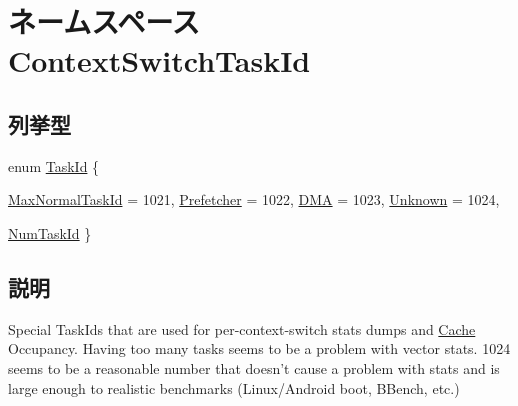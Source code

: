 \hypertarget{namespaceContextSwitchTaskId}{
\section{ネームスペース ContextSwitchTaskId}
\label{namespaceContextSwitchTaskId}
}
\subsection*{列挙型}
\begin{DoxyCompactItemize}
\item 
enum \hyperlink{namespaceContextSwitchTaskId_aa8dd388981e62e592eb420a58ab290b7}{TaskId} \{ \par
\hyperlink{namespaceContextSwitchTaskId_aa8dd388981e62e592eb420a58ab290b7a675ac8c10b4bdb20e74ca50add8789f5}{MaxNormalTaskId} =  1021, 
\hyperlink{namespaceContextSwitchTaskId_aa8dd388981e62e592eb420a58ab290b7a9f338c28f1a3b00da1f6f2cb2982dcd0}{Prefetcher} =  1022, 
\hyperlink{namespaceContextSwitchTaskId_aa8dd388981e62e592eb420a58ab290b7a6537a62f6f155792bb9a320ee2ec4d68}{DMA} =  1023, 
\hyperlink{namespaceContextSwitchTaskId_aa8dd388981e62e592eb420a58ab290b7a4e81c184ac3ad48a389cd4454c4a05bb}{Unknown} =  1024, 
\par
\hyperlink{namespaceContextSwitchTaskId_aa8dd388981e62e592eb420a58ab290b7aed1b0e3dbb2efd4067685b0be5b03167}{NumTaskId}
 \}
\end{DoxyCompactItemize}


\subsection{説明}
Special TaskIds that are used for per-\/context-\/switch stats dumps and \hyperlink{classCache}{Cache} Occupancy. Having too many tasks seems to be a problem with vector stats. 1024 seems to be a reasonable number that doesn't cause a problem with stats and is large enough to realistic benchmarks (Linux/Android boot, BBench, etc.) 

